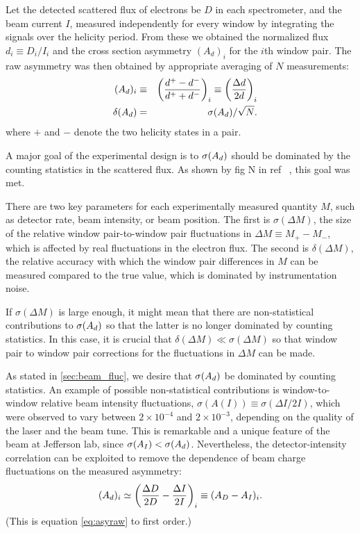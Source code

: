 Let the detected scattered flux of electrons be $D$ in each spectrometer,
and the beam current $I$,
measured independently for every window
by integrating the signals over the helicity period.  From these 
we obtained the normalized flux $d_i \equiv D_i/I_i$ and 
the cross section asymmetry $(A_d)_i$ for the
$i$th window pair. The raw asymmetry was then obtained by
appropriate averaging of $N$ measurements:
%
\begin{eqnarray} \label{eq:asyraw}
(A_d)_i & \equiv &
{\left(\frac{d^+-d^-}
{d^++d^-}\right)}_i 
\equiv {\left(\frac{\Delta d}
{2d}\right)}_i 
\nonumber \\
\quad \delta(A_d) & = &
\sigma(A_d)/\sqrt{N}. \label{eqn:pulsepair}
\end{eqnarray}
%
where $+$ and $-$ denote the two helicity states in a pair.

A major goal of the experimental design is to $\sigma(A_d)$ should be
dominated by the counting statistics in the scattered flux.
As shown by fig N in ref ~\cite{pvdis_nim}, this goal was met.

There are two key parameters for each experimentally measured
quantity $M$, such as detector rate, beam intensity, or beam position. 
The first is $\sigma(\Delta M)$, the size of the relative window pair-to-window pair
fluctuations in $\Delta M\equiv M_{+} - M_{-}$, which is affected by
real fluctuations in the electron flux. The second is
$\delta(\Delta M)$, the relative accuracy with which the window
pair differences in $M$ can be measured compared to the true
value, which is dominated by instrumentation noise.

If $\sigma(\Delta M)$ is large enough, it might mean that there
are non-statistical contributions to $\sigma(A_d)$ so that the
latter is no longer dominated by counting statistics. In this
case, it is crucial that $\delta(\Delta M)\ll\sigma(\Delta M)$ so
that window pair to window pair corrections for the fluctuations
in $\Delta M$ can be made.

As stated in \ref{sec:beam_fluc}, we desire that
$\sigma(A_d)$ be dominated by counting statistics.
An example of possible non-statistical contributions
is window-to-window relative beam intensity
fluctuations, $\sigma(A(I)) \equiv \sigma(\Delta I/2I)$,
which were observed to vary between $2\times 10^{-4}$ and
$2\times 10^{-3}$, depending on the quality of the laser and the
beam tune. This is remarkable and a unique feature of the beam at
Jefferson lab, since $\sigma(A_I)<\sigma(A_d)$. Nevertheless, the
detector-intensity correlation can be exploited to remove the
dependence of beam charge fluctuations on the measured asymmetry:
\begin{equation}
(A_d)_i \simeq
\left(\frac{\Delta D}{2D} - \frac{\Delta I}{2I}\right)_i \equiv
(A_D - A_I)_i.
\end{equation}
(This is equation \ref{eq:asyraw}
to first order.)


